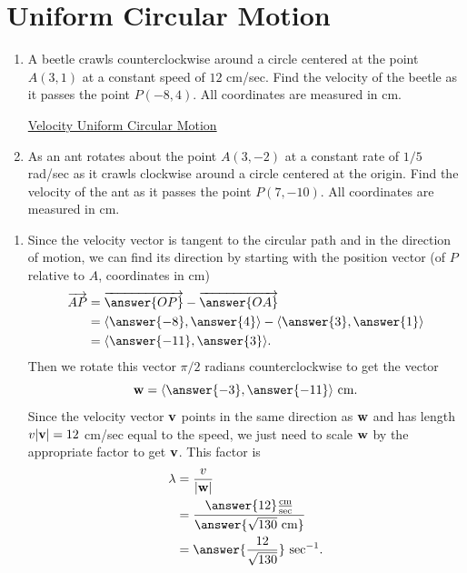 \documentclass{ximera}
\begin{document}
\section{Uniform Circular Motion}
\begin{question} \label{Qe3r3rbnnn}
\begin{enumerate}
\item A beetle crawls counterclockwise around a circle centered at the point $A(3,1)$ at a constant speed of $12$ cm/sec. Find the velocity of the beetle as it passes the point $P(-8,4)$. All coordinates are measured in cm.

\begin{onlineOnly}
    \begin{center}
\end{center}
\end{onlineOnly}

\href{https://www.desmos.com/calculator/zin4noiazt}{Velocity Uniform Circular Motion}


\item As an ant rotates about the point $A(3,-2)$ at a constant rate of $1/5$ rad/sec as it crawls clockwise around a circle centered at the origin. Find the velocity of the ant as it passes the point $P(7,-10)$.  All coordinates are measured in cm.

\end{enumerate}

\begin{explanation}
\begin{enumerate}
\item Since the velocity vector is tangent to the circular path and in the direction of motion, we can find its direction by starting with the position vector (of $P$ relative to $A$, coordinates in cm)
\begin{align*}
  \overrightarrow{AP} &= \overrightarrow{\answer{OP}} - \overrightarrow{\answer{OA}} \\
                                &= \langle \answer{-8}, \answer{4} \rangle - \langle \answer{3} , \answer{1} \rangle  \\
                                &= \langle  \answer{-11} , \answer{3} \rangle  .
\end{align*}
Then we rotate this vector $\pi/2$ radians counterclockwise to get the vector
\[
 {\bf w} = \langle \answer{-3} , \answer{-11} \rangle \text{ cm}.
\]
Since the velocity vector ${\bf v}$ points in the same direction as ${\bf w}$ and has length $v |{\bf v} |= 12$ cm/sec equal to the speed, we just need to scale ${\bf w}$ by the appropriate factor to get ${\bf v}$. This factor is
\begin{align*}
    \lambda  &= \frac{v}{|{\bf w}|}  \\
                  &= \frac{\answer{12} \frac{\text{cm}}{\text{sec}}}{\answer{\sqrt{130}\text{ cm}}} \\
                 &= \answer{\frac{12}{\sqrt{130}}} \text{ sec}^{-1} .
\end{align*}


\end{enumerate}
\end{explanation}
\end{question}
\end{document}
